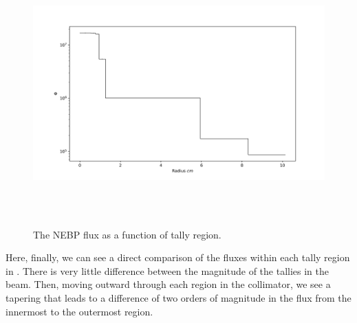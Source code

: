 \clearpage

\begin{figure}[htb]
\centering
\includegraphics[height=4in]{tex/figures/flux_rad.png}
\caption[Regional Flux]{The NEBP flux as a function of tally region.}
\label{fig:flux_rad}
\end{figure}

Here, finally, we can see a direct comparison of the fluxes within each tally region in .
There is very little difference between the magnitude of the tallies in the beam.
Then, moving outward through each region in the collimator, we see a tapering that leads to a difference of two orders of magnitude in the flux from the innermost to the outermost region.


\clearpage
